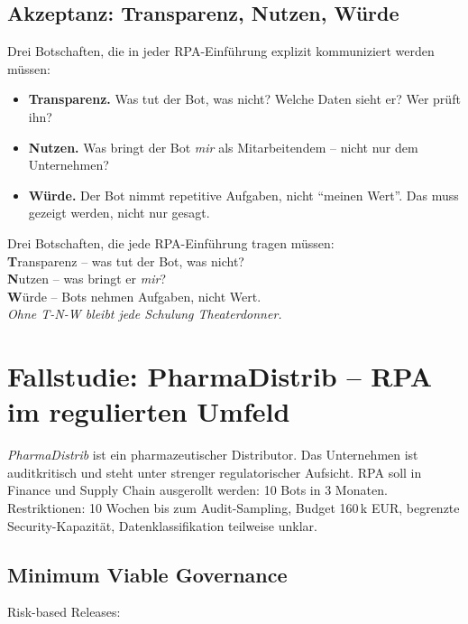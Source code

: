 \documentclass[11pt,a4paper,oneside]{article}
\newcommand{\caveatfontfallback}{\itshape}
\newcommand\caveatfont{\caveatfontfallback}%
\newcommand{\akzent}[1]{{\caveatfont\color{lpAmber}#1}}
\begin{document}
\subsection{Akzeptanz: Transparenz, Nutzen, Würde}

Drei Botschaften, die in jeder RPA-Einführung explizit kommuniziert werden müssen:

\begin{itemize}
  \item \textbf{Transparenz.} Was tut der Bot, was nicht? Welche Daten sieht er? Wer prüft ihn?
  \item \textbf{Nutzen.} Was bringt der Bot \emph{mir} als Mitarbeitendem -- nicht nur dem Unternehmen?
  \item \textbf{Würde.} Der Bot nimmt repetitive Aufgaben, nicht ``meinen Wert''. Das muss gezeigt werden, nicht nur gesagt.
\end{itemize}

\begin{eselsbox}[Eselsbrücke: \akzent{T-N-W}]
Drei Botschaften, die jede RPA-Einführung tragen müssen:\\[2pt]
\textbf{T}ransparenz -- was tut der Bot, was nicht?\\
\textbf{N}utzen -- was bringt er \emph{mir}?\\
\textbf{W}ürde -- Bots nehmen Aufgaben, nicht Wert.\\[2pt]
\emph{Ohne T-N-W bleibt jede Schulung Theaterdonner.}
\end{eselsbox}

\section{Fallstudie: PharmaDistrib -- RPA im regulierten Umfeld}

\emph{PharmaDistrib} ist ein pharmazeutischer Distributor. Das Unternehmen ist auditkritisch und steht unter strenger regulatorischer Aufsicht. RPA soll in Finance und Supply Chain ausgerollt werden: 10 Bots in 3 Monaten. Restriktionen: 10 Wochen bis zum Audit-Sampling, Budget 160\,k EUR, begrenzte Security-Kapazität, Datenklassifikation teilweise unklar.

\subsection{Minimum Viable Governance}

Risk-based Releases:
\end{document}
